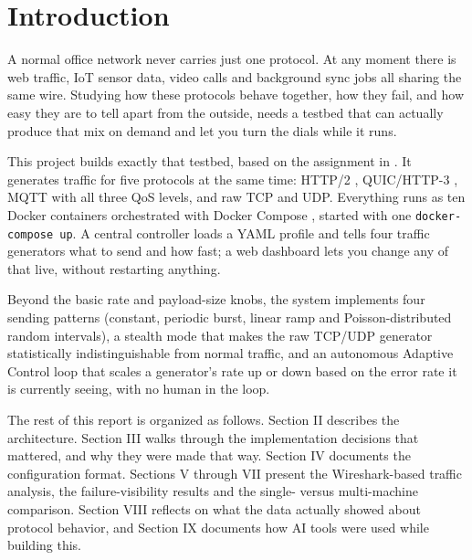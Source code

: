 \section{Introduction}

A normal office network never carries just one protocol. At any moment there is
web traffic, IoT sensor data, video calls and background sync jobs all sharing
the same wire. Studying how these protocols behave together, how they fail, and
how easy they are to tell apart from the outside, needs a testbed that can
actually produce that mix on demand and let you turn the dials while it runs.

This project builds exactly that testbed, based on the assignment in
\cite{hsrwassignment}. It generates traffic for five protocols at the same
time: HTTP/2 \cite{rfc7540}, QUIC/HTTP-3 \cite{rfc9000, rfc9114}, MQTT
\cite{mqtt5} with all three QoS levels, and raw TCP and UDP. Everything runs
as ten Docker containers orchestrated with Docker Compose \cite{dockercompose},
started with one \texttt{docker-compose up}. A central controller loads a YAML profile
and tells four traffic generators what to send and how fast; a web dashboard
lets you change any of that live, without restarting anything.

Beyond the basic rate and payload-size knobs, the system implements four
sending patterns (constant, periodic burst, linear ramp and Poisson-distributed
random intervals), a stealth mode that makes the raw TCP/UDP generator
statistically indistinguishable from normal traffic, and an autonomous Adaptive
Control loop that scales a generator's rate up or down based on the error rate
it is currently seeing, with no human in the loop.

The rest of this report is organized as follows. Section II describes the
architecture. Section III walks through the implementation decisions that
mattered, and why they were made that way. Section IV documents the
configuration format. Sections V through VII present the Wireshark-based
traffic analysis, the failure-visibility results and the single- versus
multi-machine comparison. Section VIII reflects on what the data actually
showed about protocol behavior, and Section IX documents how AI tools were
used while building this.

